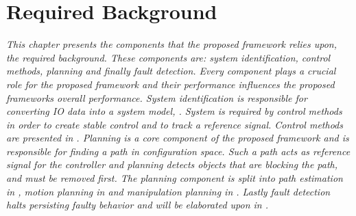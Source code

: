 \chapter{Required Background}%
\label{chap:required_background}
\textit{This chapter presents the components that the proposed framework relies upon, the required background. These components are: system identification, control methods, planning and finally fault detection. Every component plays a crucial role for the proposed framework and their performance influences the proposed frameworks overall performance. System identification is responsible for converting \ac{IO} data into a system model, . System is required by control methods in order to create stable control and to track a reference signal. Control methods are presented in . Planning is a core component of the proposed framework and is responsible for finding a path in configuration space. Such a path acts as reference signal for the controller and planning detects objects that are blocking the path, and must be removed first. The planning component is split into path estimation in , motion planning in  and manipulation planning in . Lastly fault detection halts persisting faulty behavior and will be elaborated upon in .\bs}

% 






